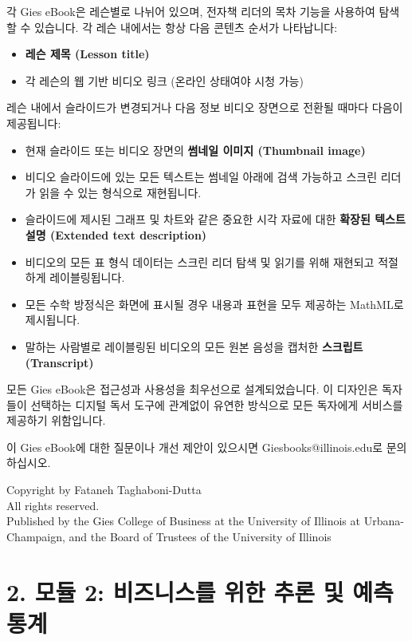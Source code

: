 \documentclass[11pt,a4paper]{article}
\theoremstyle{definition}
\begin{document}
각 Gies eBook은 레슨별로 나뉘어 있으며, 전자책 리더의 목차 기능을 사용하여 탐색할 수 있습니다. 각 레슨 내에서는 항상 다음 콘텐츠 순서가 나타납니다:
\begin{itemize}
    \item \textbf{레슨 제목 (Lesson title)}
    \item 각 레슨의 웹 기반 비디오 링크 (온라인 상태여야 시청 가능)
\end{itemize}
레슨 내에서 슬라이드가 변경되거나 다음 정보 비디오 장면으로 전환될 때마다 다음이 제공됩니다:
\begin{itemize}
    \item 현재 슬라이드 또는 비디오 장면의 \textbf{썸네일 이미지 (Thumbnail image)}
    \item 비디오 슬라이드에 있는 모든 텍스트는 썸네일 아래에 검색 가능하고 스크린 리더가 읽을 수 있는 형식으로 재현됩니다.
    \item 슬라이드에 제시된 그래프 및 차트와 같은 중요한 시각 자료에 대한 \textbf{확장된 텍스트 설명 (Extended text description)}
    \item 비디오의 모든 표 형식 데이터는 스크린 리더 탐색 및 읽기를 위해 재현되고 적절하게 레이블링됩니다.
    \item 모든 수학 방정식은 화면에 표시될 경우 내용과 표현을 모두 제공하는 MathML로 제시됩니다.
    \item 말하는 사람별로 레이블링된 비디오의 모든 원본 음성을 캡처한 \textbf{스크립트 (Transcript)}
\end{itemize}
모든 Gies eBook은 접근성과 사용성을 최우선으로 설계되었습니다. 이 디자인은 독자들이 선택하는 디지털 독서 도구에 관계없이 유연한 방식으로 모든 독자에게 서비스를 제공하기 위함입니다.

이 Gies eBook에 대한 질문이나 개선 제안이 있으시면 Giesbooks@illinois.edu로 문의하십시오.

\begin{infobox}[title=저작권 정보]
Copyright  by Fataneh Taghaboni-Dutta \\
All rights reserved. \\
Published by the Gies College of Business at the University of Illinois at Urbana-Champaign, and the Board of Trustees of the University of Illinois
\end{infobox}

\newpage
\section{2. 모듈 2: 비즈니스를 위한 추론 및 예측 통계}
\end{document}
